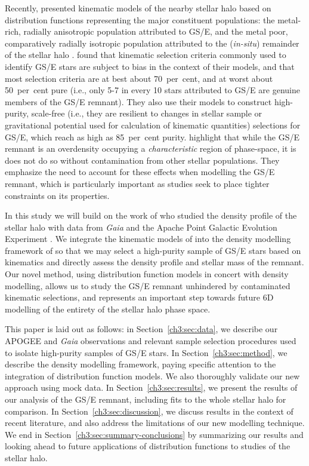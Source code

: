 Recently, \textcite[][hereafter LBM22]{lane22} presented kinematic models of the nearby stellar halo based on distribution functions representing the major constituent populations: the metal-rich, radially anisotropic population attributed to GS/E, and the metal poor, comparatively radially isotropic population attributed to the (\textit{in-situ}) remainder of the stellar halo \parencite[e.g.][]{belokurov18,haywood18}. \cite{lane22} found that kinematic selection criteria commonly used to identify GS/E stars are subject to bias in the context of their models, and that most selection criteria are at best about 70~per~cent, and at worst about 50~per~cent pure (i.e., only 5-7 in every 10 stars attributed to GS/E are genuine members of the GS/E remnant). They also use their models to construct high-purity, scale-free (i.e., they are resilient to changes in stellar sample or gravitational potential used for calculation of kinematic quantities) selections for GS/E, which reach as high as 85~per~cent purity. \cite{lane22} highlight that while the GS/E remnant is an overdensity occupying a \textit{characteristic} region of phase-space, it is does not do so without contamination from other stellar populations. They emphasize the need to account for these effects when modelling the GS/E remnant, which is particularly important as studies seek to place tighter constraints on its properties.

In this study we will build on the work of \textcite[][hereafter MB20]{mackereth20} who studied the density profile of the stellar halo with data from \textit{Gaia} and the Apache Point Galactic Evolution Experiment \parencite[APOGEE][]{apogee}. We integrate the kinematic models of \cite{lane22} into the density modelling framework of \cite{mackereth20} so that we may select a high-purity sample of GS/E stars based on kinematics and directly assess the density profile and stellar mass of the remnant. Our novel method, using distribution function models in concert with density modelling, allows us to study the GS/E remnant unhindered by contaminated kinematic selections, and represents an important step towards future 6D modelling of the entirety of the stellar halo phase space.

This paper is laid out as follows: in Section~\ref{ch3:sec:data}, we describe our APOGEE and \textit{Gaia} observations and relevant sample selection procedures used to isolate high-purity samples of GS/E stars. In Section~\ref{ch3:sec:method}, we describe the density modelling framework, paying specific attention to the integration of distribution function models. We also thoroughly validate our new approach using mock data. In Section~\ref{ch3:sec:results}, we present the results of our analysis of the GS/E remnant, including fits to the whole stellar halo for comparison. In Section~\ref{ch3:sec:discussion}, we discuss results in the context of recent literature, and also address the limitations of our new modelling technique. We end in Section~\ref{ch3:sec:summary-conclusions} by summarizing our results and looking ahead to future applications of distribution functions to studies of the stellar halo.

